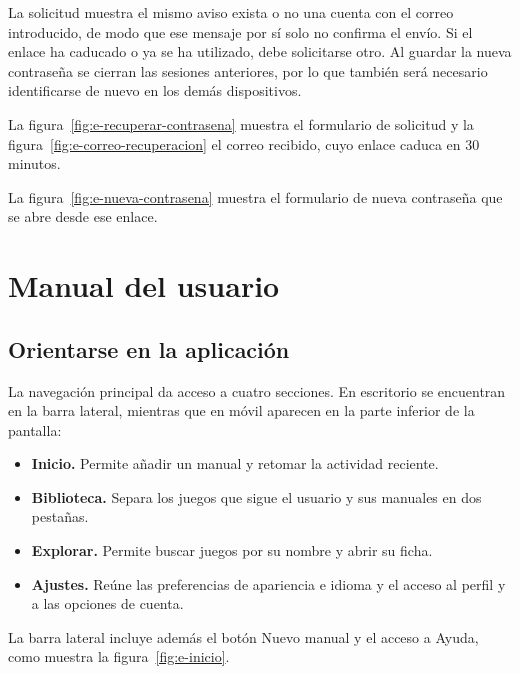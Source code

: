 La solicitud muestra el mismo aviso exista o no una cuenta con el correo
introducido, de modo que ese mensaje por sí solo no confirma el envío. Si
el enlace ha caducado o ya se ha utilizado, debe solicitarse otro. Al
guardar la nueva contraseña se cierran las sesiones anteriores, por lo que
también será necesario identificarse de nuevo en los demás dispositivos.

La figura~\ref{fig:e-recuperar-contrasena} muestra el formulario de
solicitud y la figura~\ref{fig:e-correo-recuperacion} el correo recibido,
cuyo enlace caduca en 30 minutos.



La figura~\ref{fig:e-nueva-contrasena} muestra el formulario de nueva
contraseña que se abre desde ese enlace.


\section{Manual del usuario}
\label{sec:e-manual}

\subsection{Orientarse en la aplicación}
\label{sec:e-navegacion}

La navegación principal da acceso a cuatro secciones. En escritorio se
encuentran en la barra lateral, mientras que en móvil aparecen en la parte
inferior de la pantalla:

\begin{itemize}
    \item \textbf{Inicio.} Permite añadir un manual y retomar la actividad
    reciente.
    \item \textbf{Biblioteca.} Separa los juegos que sigue el usuario y sus
    manuales en dos pestañas.
    \item \textbf{Explorar.} Permite buscar juegos por su nombre y abrir su
    ficha.
    \item \textbf{Ajustes.} Reúne las preferencias de apariencia e idioma y
    el acceso al perfil y a las opciones de cuenta.
\end{itemize}

La barra lateral incluye además el botón \guillemotleft{}Nuevo manual\guillemotright{} y el
acceso a \guillemotleft{}Ayuda\guillemotright{}, como muestra la figura~\ref{fig:e-inicio}.

